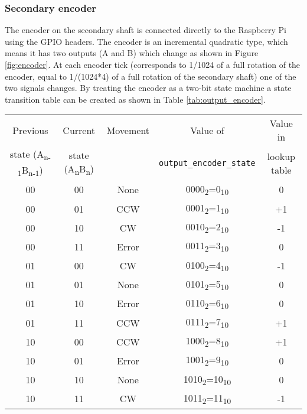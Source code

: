 \documentclass[12pt]{article}
\begin{document}
\subsubsection{Secondary encoder}
The encoder on the secondary shaft is connected directly to the Raspberry Pi using the GPIO headers. The encoder is an incremental quadratic type, which means it has two outputs (A and B) which change as shown in Figure \ref{fig:encoder}. At each encoder tick (corresponds to 1/1024 of a full rotation of the encoder, equal to 1/(1024*4) of a full rotation of the secondary shaft) one of the two signals changes. By treating the encoder as a two-bit state machine a state transition table can be created as shown in Table \ref{tab:output_encoder}.\\
\begin{table}[h]
    \centering
    \begin{tabular}{|c|c|c|c|c|}
    \hline
        Previous  & Current  & Movement&Value of & Value in \\
        state (A\textsubscript{n-1}B\textsubscript{n-1}) & state (A\textsubscript{n}B\textsubscript{n})&&\verb|output_encoder_state|& lookup table\\%
        \hline
         00&00&None&0000\textsubscript{2}=0\textsubscript{10}&0\\ 
         00&01&CCW&0001\textsubscript{2}=1\textsubscript{10}&+1\\ 
         00&10&CW&0010\textsubscript{2}=2\textsubscript{10}&-1\\ 
         00&11&Error&0011\textsubscript{2}=3\textsubscript{10}&0\\ 
         
         01&00&CW&0100\textsubscript{2}=4\textsubscript{10}&-1\\ 
         01&01&None&0101\textsubscript{2}=5\textsubscript{10}&0\\ 
         01&10&Error&0110\textsubscript{2}=6\textsubscript{10}&0\\ 
         01&11&CCW&0111\textsubscript{2}=7\textsubscript{10}&+1\\ 
         
         10&00&CCW&1000\textsubscript{2}=8\textsubscript{10}&+1\\ 
         10&01&Error&1001\textsubscript{2}=9\textsubscript{10}&0\\ 
         10&10&None&1010\textsubscript{2}=10\textsubscript{10}&0\\ 
         10&11&CW&1011\textsubscript{2}=11\textsubscript{10}&-1\\ 
         

\end{tabular}
\end{table}
\end{document}
